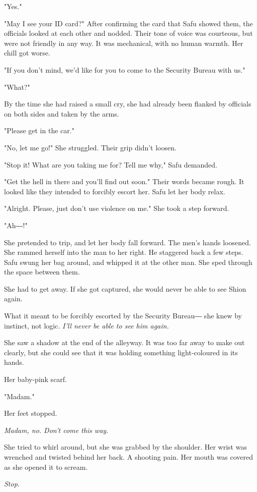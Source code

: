 "Yes."

"May I see your ID card?" After confirming the card that Safu showed
them, the officials looked at each other and nodded. Their tone of voice
was courteous, but were not friendly in any way. It was mechanical, with
no human warmth. Her chill got worse.

"If you don't mind, we'd like for you to come to the Security Bureau
with us."

"What?"

By the time she had raised a small cry, she had already been flanked by
officials on both sides and taken by the arms.

"Please get in the car."

"No, let me go!" She struggled. Their grip didn't loosen.

"Stop it! What are you taking me for? Tell me why," Safu demanded.

"Get the hell in there and you'll find out soon." Their words became
rough. It looked like they intended to forcibly escort her. Safu let her
body relax.

"Alright. Please, just don't use violence on me." She took a step
forward.

"Ah―!"

She pretended to trip, and let her body fall forward. The men's hands
loosened. She rammed herself into the man to her right. He staggered
back a few steps. Safu swung her bag around, and whipped it at the other
man. She sped through the space between them.

She had to get away. If she got captured, she would never be able to see
Shion again.

What it meant to be forcibly escorted by the Security Bureau― she knew
by instinct, not logic. \emph{I'll never be able to see him again.}

She saw a shadow at the end of the alleyway. It was too far away to make
out clearly, but she could see that it was holding something
light-coloured in its hands.

Her baby-pink scarf.

"Madam."

Her feet stopped.

\emph{Madam, no. Don't come this way.}

She tried to whirl around, but she was grabbed by the shoulder. Her
wrist was wrenched and twisted behind her back. A shooting pain. Her
mouth was covered as she opened it to scream.

\emph{Stop.}

